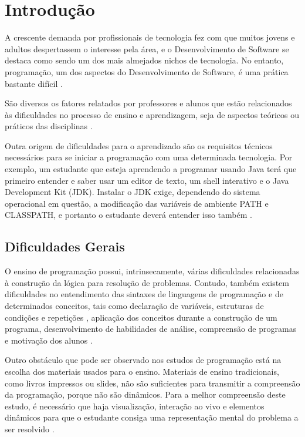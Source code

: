 \chapter[Introdução]{Introdução}

A crescente demanda por profissionais de tecnologia fez com que muitos jovens e adultos despertassem o interesse pela área, e o Desenvolvimento de Software se destaca como sendo um dos mais almejados nichos de
tecnologia. No entanto, programação, um dos aspectos do Desenvolvimento de Software, é uma prática bastante difícil \cite{robins2003}.

São diversos os fatores relatados por professores e alunos que estão relacionados às dificuldades no processo de ensino e aprendizagem, seja de aspectos teóricos ou práticos das disciplinas \cite{marcolino2015}.%

Outra origem de dificuldades para o aprendizado são os requisitos técnicos necessários para se iniciar a programação com uma determinada tecnologia. Por exemplo, um estudante que esteja aprendendo a programar usando Java terá que primeiro entender e saber usar um editor de texto, um shell interativo e o Java Development Kit (JDK). Instalar o JDK exige, dependendo do sistema operacional em questão, a modificação das variáveis de ambiente PATH e CLASSPATH, e portanto o estudante deverá entender isso também \cite{truong2003}.


\section{Dificuldades Gerais}
	
O ensino de programação possui, intrinsecamente, várias dificuldades relacionadas à construção da lógica para resolução de problemas. Contudo, também existem dificuldades no entendimento das sintaxes de linguagens de programação e de determinados conceitos, tais como declaração de variáveis, estruturas de condições e repetições \cite{helminen2010}, aplicação dos conceitos durante a construção de um programa, desenvolvimento de habilidades de análise, compreensão de programas e motivação dos alunos \cite{robins2010}.

Outro obstáculo que pode ser observado nos estudos de programação está na escolha dos materiais usados para o ensino. Materiais de ensino tradicionais, como livros impressos ou slides, não são suficientes para transmitir a compreensão da programação, porque não são dinâmicos. Para a melhor compreensão deste estudo, é necessário que haja visualização, interação ao vivo e elementos dinâmicos para que o estudante consiga uma representação mental do problema a ser resolvido \cite{gomesmendes2007, cheah2020}.

